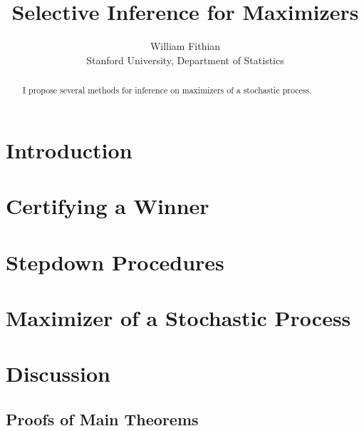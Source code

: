 \documentclass{article}
\theoremstyle{definition}
\begin{document}
\title{Selective Inference for Maximizers}
\author{William Fithian\\[5pt]
{\normalsize Stanford University, Department of Statistics}}
\maketitle


\begin{abstract}
  I propose several methods for inference on maximizers of a stochastic process.
\end{abstract}


\section{Introduction}



\section{Certifying a Winner}



\section{Stepdown Procedures}



\section{Maximizer of a Stochastic Process}



\section{Discussion}




\begin{appendix}


\section{Proofs of Main Theorems}


   
\end{appendix}
\end{document}
